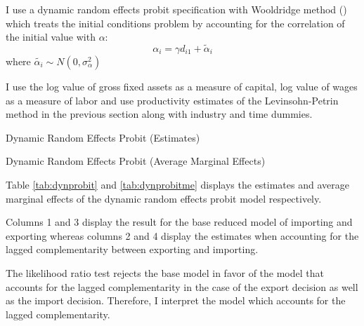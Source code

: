 \documentclass[12pt]{article}
\begin{document}
I use a dynamic random effects probit specification with Wooldridge
method (\textcite{wooldridge2005simple}) which treats the initial conditions problem by accounting for
the correlation of the initial value with $\alpha$:
$$  \alpha_{i}= \gamma d_{i1}+ \tilde{\alpha}_{i} $$
where $ \tilde{\alpha_{i}} \sim N(0, \sigma_{\alpha}^{2}) $

I use the log value of gross fixed assets as a measure of capital, log
value of wages as a measure of labor and use productivity estimates  of
the Levinsohn-Petrin method in the previous section along with
industry and time dummies.  

\begin{center}
\begin{table}[H]
\caption{Dynamic Random Effects Probit (Estimates)}
\label{tab:dynprobit}

\end{table}
\end{center}
\restoregeometry
\begin{center}
\begin{table}[H]
\caption{Dynamic Random Effects Probit (Average Marginal Effects)}
\label{tab:dynprobitme}

\end{table}
\end{center}

Table \ref{tab:dynprobit} and \ref{tab:dynprobitme} displays the
estimates and average marginal effects of the dynamic random
effects probit model respectively. 

Columns 1 and 3 display the result for the base
reduced model of importing and exporting  whereas columns 2 and 4
display the estimates when accounting for the lagged complementarity
between exporting and importing.

The likelihood ratio test  rejects the base model in favor of the
model that accounts for the lagged complementarity in the case of 
the export decision as well as the import decision. Therefore, I
interpret the model which accounts for the lagged complementarity.
 
\end{document}
